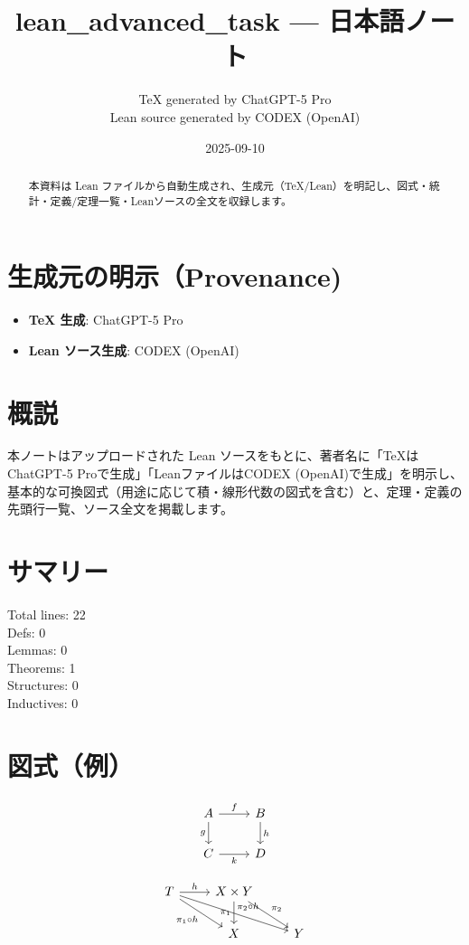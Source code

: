 \documentclass[12pt]{article}
\title{lean\_advanced\_task — 日本語ノート}
\author{TeX generated by ChatGPT-5 Pro\\Lean source generated by CODEX (OpenAI)}
\date{2025-09-10}
\theoremstyle{definition}
\begin{document}
\maketitle

\begin{abstract}
本資料は Lean ファイルから自動生成され、生成元（TeX/Lean）を明記し、図式・統計・定義/定理一覧・Leanソースの全文を収録します。
\end{abstract}

\section*{生成元の明示（Provenance)}
\begin{itemize}
  \item \textbf{TeX 生成}: ChatGPT-5 Pro
  \item \textbf{Lean ソース生成}: CODEX (OpenAI)
\end{itemize}

\section*{概説}
本ノートはアップロードされた Lean ソースをもとに、著者名に「TeXはChatGPT-5 Proで生成」「LeanファイルはCODEX (OpenAI)で生成」を明示し、
基本的な可換図式（用途に応じて積・線形代数の図式を含む）と、定理・定義の先頭行一覧、ソース全文を掲載します。

\section*{サマリー}
Total lines: 22\\
Defs: 0\\
Lemmas: 0\\
Theorems: 1\\
Structures: 0\\
Inductives: 0

\section*{図式（例）}

\[
\begin{tikzcd}
A \arrow[r, "f"] \arrow[d, "g"'] & B \arrow[d, "h"] \\
C \arrow[r, "k"'] & D
\end{tikzcd}
\]



\[
\begin{tikzcd}
T \arrow[r, "h"] \arrow[dr, swap, "\pi_1\circ h"] \arrow[drr, "\pi_2\circ h"] & X\times Y \arrow[d, swap, "\pi_1"] \arrow[dr, "\pi_2"] \\
& X & Y
\end{tikzcd}
\]
\end{document}
